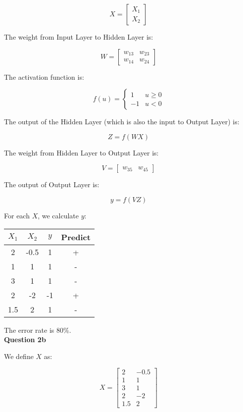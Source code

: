 \documentclass[11pt,a4paper]{report}
\begin{document}
\begin{multicols*}{2}
$$X = \begin{bmatrix} X_1 \\ X_2 \end{bmatrix}$$

\noindent The weight from Input Layer to Hidden Layer is:

$$W =
\begin{bmatrix}
w_{13} & w_{23} \\
w_{14} & w_{24}
\end{bmatrix}$$

\noindent The activation function is:

$$
f(u) =
\begin{cases}
1 & u \ge 0\\
-1 & u < 0
\end{cases}
$$

\noindent The output of the Hidden Layer (which is also the input to Output Layer) is:

$$Z = f(W X)$$

\noindent The weight from Hidden Layer to Output Layer is:

$$V =
\begin{bmatrix}
w_{35} & w_{45}
\end{bmatrix}$$

\noindent The output of Output Layer is:

$$y = f(V Z)$$

\noindent For each $X$, we calculate $y$:

\begin{center}
\begin{tabular}{|c | c | c | c |}
\hline
$X_1$ & $X_2$  & $y$ & Predict \\ \hline
2     & -0.5   & 1   & +       \\
1     & 1      & 1   & -       \\
3     & 1      & 1   & -       \\
2     & -2     & -1  & +       \\
1.5   & 2      & 1   & -       \\ \hline
\end{tabular}
\end{center}

\noindent The error rate is $80\%$.\\

\noindent \textbf{Question 2b}

\noindent We define $X$ as:

$$X =
\begin{bmatrix}
2 & -0.5 \\
1 & 1 \\
3 & 1 \\
2 & -2 \\
1.5 & 2
\end{bmatrix}$$


\end{multicols*}
\end{document}

